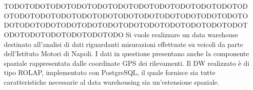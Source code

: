 \chapter*{}
TODOTODOTODOTODOTODOTODOTODOTODOTODOTODOTODOTODOTODOTODOTODOTODOTODOTODOTODOTODOTODOTODOTODOTODOTODOTODOTODOTODOTODOTODOTODOTODOTODOTODOTODOTODOTODOTODOTODOTODOTODO
Si vuole realizzare un data warehouse destinato all’analisi di dati riguardanti misurazioni effettuate su veicoli da parte dell’Istituto Motori di Napoli.
I dati in questione presentano anche la componente spaziale rappresentata dalle coordinate GPS dei rilevamenti.
Il DW realizzato è di tipo ROLAP, implementato con PostgreSQL, il quale fornisce sia tutte caratteristiche necessarie al data warehousing sia un’estensione spaziale.